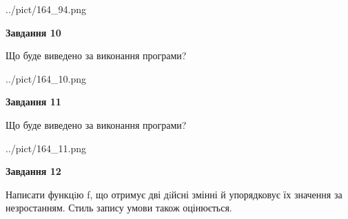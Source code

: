\documentclass[12pt, ukrainian]{article}
\begin{document}
{\begin {large}
\begin{center}
	{../pict/164_94.png}
\end{center}
\newpage

{\begin {center}\textbf{Завдання 10}\end {center}}

Що буде виведено за виконання програми?\par
\begin{center}
	{../pict/164_10.png}
\end{center}
\newpage

{\begin {center}\textbf{Завдання 11}\end {center}}

Що буде виведено за виконання програми?\par
\begin{center}
	{../pict/164_11.png}
\end{center}
\newpage

{\begin {center}\textbf{Завдання 12}\end {center}}


Написати функцiю f, що отримує дві дiйсні змінні й упорядковує їх значення за незростанням. Стиль запису умови також оцінюється.\par
\newpage

\end {large}}
\end{document}
